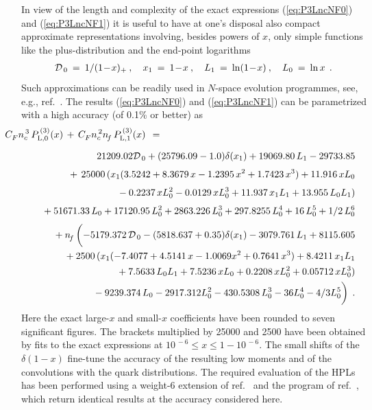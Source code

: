 \documentclass[12pt]{article}
\newcommand{\bea}{\begin{eqnarray}}
\newcommand{\eea}{\end{eqnarray}}
\newcommand{\nn}{\nonumber}
\newcommand{\hspn}{{\hspace{-5mm}}}
\newcommand{\hspp}{{\hspace{5mm}}}
\def\ncs{{n_{c}^{\,2}}}
\def\nct{{n_{c}^{\,3}}}
\def\cf{{C^{}_F}}
\def\nf{{n^{}_{\! f}}}
\begin{document}
In view of the length and complexity of the exact expressions
(\ref{eq:P3LncNF0}) and (\ref{eq:P3LncNF1}) it is useful to have at one's 
disposal also compact approximate representations involving, besides powers 
of $x$, only simple functions like the plus-distribution and the end-point 
logarithms
% 
\bea
\label{eq:logs}
  {\cal D}_{\,0} \: = \: 1/(1\!-\!x)_+ \: ,
  \quad x_1 \: = \: 1\!-\!x \: ,
  \quad L_1 \: = \: \ln (1\!-\!x) \: ,
  \quad L_0 \: = \: \ln x \:\: .
\eea
%
Such approximations can be readily used in $N$-space evolution programmes, 
see, e.g., ref.~\cite{Vogt:2004ns}.
The results (\ref{eq:P3LncNF0}) and (\ref{eq:P3LncNF1}) can be parametrized
with a high accuracy (of 0.1\% or better) as
%
\bea
\label{eq:Pns3L12}
{\lefteqn{ \hspn\hspn
       \cf \nct\, P_{{\rm L},0}^{\,(3)}(x) 
 \,+\, \cf \ncs \nf\,P_{{\rm L},1}^{\,(3)}(x) 
 \:\:=\:\: 
}}
\nn
\\[2mm] && 
 21209.02 \* {\cal D}_{\,0} 
 + (25796.09 - 1.0) \* \delta(x_1) + 19069.80 \,\* L_1 - 29733.85
\nonumber \\[1mm] && \mbox{}
 \,+\, 25000 \,\* ( x_1 \*  ( 3.5242 
 + 8.3679 \,\*  x - 1.2395 \,\*  x^2 + 1.7423 \,\*  x^3 ) 
 + 11.916 \,\*  x \* L_0 
\nonumber \\[1mm] && \mbox{\hspp}
 - 0.2237 \,\*  x \* L_0^2 - 0.0129 \,\*  x \* L_0^3 
 + 11.937 \,\*  x_1 \* L_1 + 13.955  \,\*  L_0 \* L_1 ) 
\nonumber \\[1mm] && \mbox{}
 + 51671.33 \,\* L_0 
 + 17120.95 \,\* L_0^2 + 2863.226 \,\* L_0^3 + 297.8255 \,\* L_0^4 
 + 16 \,\* L_0^5 + 1/2\,\* L_0^6 
\nonumber \\[1mm] && \mbox{\hspn}
 + \nf \,\* \biggl(
 - 5179.372 \,\* {\cal D}_{\,0} 
 - ( 5818.637 + 0.35) \* \delta(x_1) 
 - 3079.761 \,\* L_1 + 8115.605
\nonumber \\ && \mbox{}
 + 2500 \,\*  ( x_1 \*  ( - 7.4077 
 + 4.5141 \,\*  x - 1.0069 \*  x^2
 + 0.7641 \,\*  x^3 ) + 8.4211 \,\*  x_1 \* L_1 
\nonumber \\ && \mbox{\hspp}
 + 7.5633 \,\*  L_0 \* L_1
 + 7.5236 \,\*  x \* L_0 + 0.2208 \,\*  x \* L_0^2 
 + 0.05712 \,\*  x \* L_0^3 )
\nonumber \\ && \mbox{}
 - 9239.374 \,\* L_0 - 2917.312 \* L_0^2 
 - 430.5308 \,\* L_0^3 - 36 \* L_0^4 - 4/3 \* L_0^5
 \biggr) 
\:\: .
\eea
%
Here the exact large-$x$ and small-$x$ coefficients have been rounded to 
seven significant figures.
The brackets multiplied by 25000 and 2500 have been obtained by fits to the 
exact expressions at $10^{\,-6} \leq x \leq 1 - 10^{\,-6}$.
The small shifts of the $\delta(1-x)$ fine-tune the accuracy of the resulting 
low moments and of the convolutions with the quark distributions.
The required evaluation of the HPLs has been performed using a weight-6
extension of ref.~\cite{Gehrmann:2001pz} and the program of 
ref.~\cite{ABRS-HPL}, which return identical results at the accuracy 
considered here.
\end{document}
